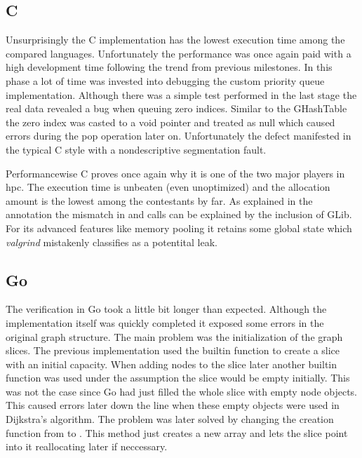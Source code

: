 \subsection{C}
\label{subsec:Implementation::Verification::C}

Unsurprisingly the C implementation has the lowest execution time among the compared languages. Unfortunately the performance was once again paid with a high development time following the trend from previous milestones. In this phase a lot of time was invested into debugging the custom priority queue implementation. Although there was a simple test performed in the last stage the real data revealed a bug when queuing zero indices. Similar to the GHashTable the zero index was casted to a void pointer and treated as null which caused errors during the pop operation later on. Unfortunately the defect manifested in the typical C style with a nondescriptive segmentation fault.

Performancewise C proves once again why it is one of the two major players in \gls{hpc}. The execution time is unbeaten (even unoptimized) and the allocation amount is the lowest among the contestants by far. As explained in the annotation the mismatch in  and  calls can be explained by the inclusion of GLib. For its advanced features like memory pooling it retains some global state which \textit{valgrind} mistakenly classifies as a potentital leak.

\subsection{Go}
\label{subsec:Implementation::Verification::Go}

The verification in Go took a little bit longer than expected. Although the implementation itself was quickly completed it exposed some errors in the original graph structure. The main problem was the initialization of the graph slices. The previous implementation used the builtin function  to create a slice with an initial capacity. When adding nodes to the slice later another builtin function  was used under the assumption the slice would be empty initially. This was not the case since Go had just filled the whole slice with empty node objects. This caused errors later down the line when these empty objects were used in Dijkstra's algorithm. The problem was later solved by changing the creation function from  to . This method just creates a new array and lets the slice point into it reallocating later if neccessary.

